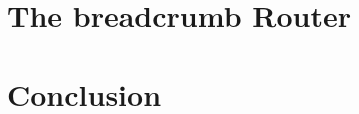 \documentclass{sig-alternate}
\begin{document}
\section{The {\sc breadcrumb} Router}



%
%




%
%
\section{Conclusion}




%
%
%
%
%
%
%
%
%
%



\end{document}
